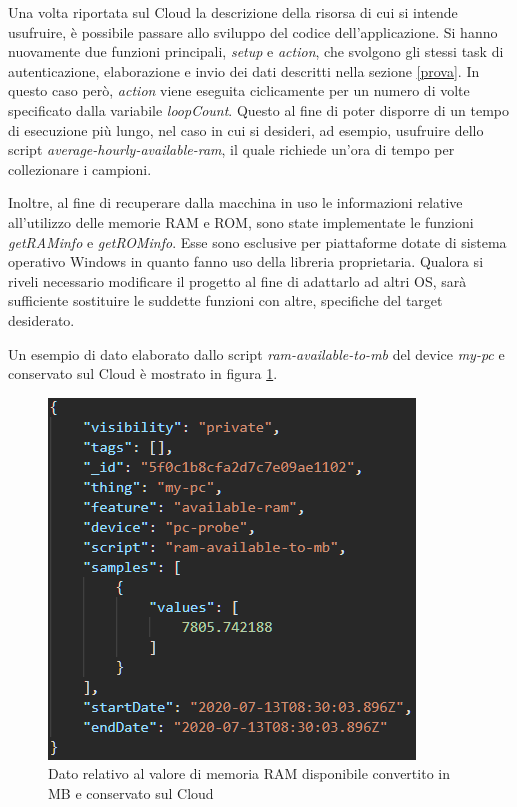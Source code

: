 Una volta riportata sul Cloud la descrizione della risorsa di cui si intende usufruire, è possibile passare allo sviluppo del codice dell'applicazione. Si hanno nuovamente due funzioni principali, \textit{setup} e \textit{action}, che svolgono gli stessi task di autenticazione, elaborazione e invio dei dati descritti nella sezione \ref{prova}. In questo caso però, \textit{action} viene eseguita ciclicamente per un numero di volte specificato dalla variabile \textit{loopCount}. Questo al fine di poter disporre di un tempo di esecuzione più lungo, nel caso in cui si desideri, ad esempio, usufruire dello script \textit{average-hourly-available-ram}, il quale richiede un'ora di tempo per collezionare i campioni.

Inoltre, al fine di recuperare dalla macchina in uso le informazioni relative all'utilizzo delle memorie RAM e ROM, sono state implementate le funzioni \textit{getRAMinfo} e  \textit{getROMinfo}. Esse sono esclusive per piattaforme dotate di sistema operativo Windows in quanto fanno uso della libreria proprietaria. Qualora si riveli necessario modificare il progetto al fine di adattarlo ad altri OS, sarà sufficiente sostituire le suddette funzioni con altre, specifiche del target desiderato.

Un esempio di dato elaborato dallo script \textit{ram-available-to-mb} del device \textit{my-pc} e conservato sul Cloud è mostrato in figura \ref{datowin}.

\begin{figure}[H]
	\centering
	\includegraphics[scale=0.7]{pics/datowin}
	\caption{Dato relativo al valore di memoria RAM disponibile convertito in MB e conservato sul Cloud}
	\label{datowin}
\end{figure}

